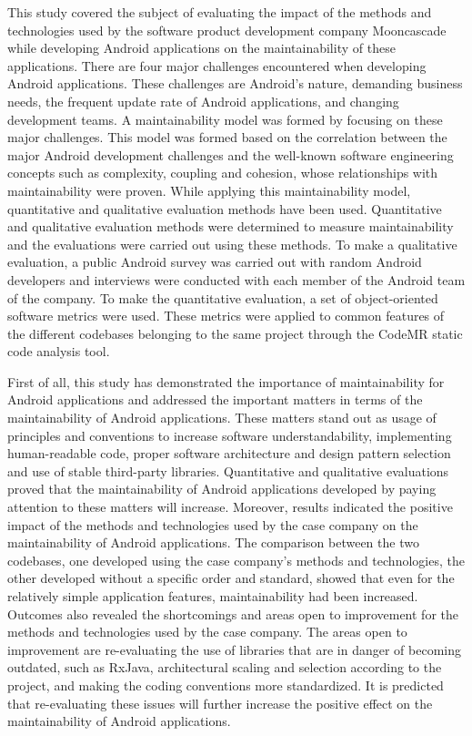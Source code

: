 This study covered the subject of evaluating the impact of the methods and technologies used by the software product development company Mooncascade while developing Android applications on the maintainability of these applications.
There are four major challenges encountered when developing Android applications. These challenges are Android’s nature, demanding business needs, the frequent update rate of Android applications, and changing development teams. A maintainability model was formed by focusing on these major challenges. This model was formed based on the correlation between the major Android development challenges and the well-known software engineering concepts such as complexity, coupling and cohesion, whose relationships with maintainability were proven. While applying this maintainability model, quantitative and qualitative evaluation methods have been used. Quantitative and qualitative evaluation methods were determined to measure maintainability and the evaluations were carried out using these methods. To make a qualitative evaluation, a public Android survey was carried out with random Android developers and interviews were conducted with each member of the Android team of the company. To make the quantitative evaluation, a set of object-oriented software metrics were used. These metrics were applied to common features of the different codebases belonging to the same project through the CodeMR static code analysis tool.

First of all, this study has demonstrated the importance of maintainability for Android applications and addressed the important matters in terms of the maintainability of Android applications. These matters stand out as usage of principles and conventions to increase software understandability, implementing human-readable code, proper software architecture and design pattern selection and use of stable third-party libraries. Quantitative and qualitative evaluations proved that the maintainability of Android applications developed by paying attention to these matters will increase. Moreover, results indicated the positive impact of the methods and technologies used by the case company on the maintainability of Android applications. The comparison between the two codebases, one developed using the case company's methods and technologies, the other developed without a specific order and standard, showed that even for the relatively simple application features, maintainability had been increased. Outcomes also revealed the shortcomings and areas open to improvement for the methods and technologies used by the case company. The areas open to improvement are re-evaluating the use of libraries that are in danger of becoming outdated, such as RxJava, architectural scaling and selection according to the project, and making the coding conventions more standardized. It is predicted that re-evaluating these issues will further increase the positive effect on the maintainability of Android applications. 

